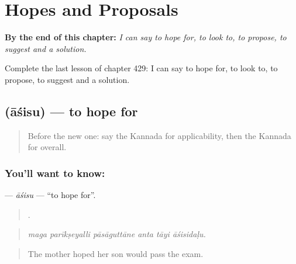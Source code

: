 
\chapter{Hopes and Proposals}
\label{ch:ka-hopes-and-proposals}

\begin{chapteropening}
\textbf{By the end of this chapter:} \emph{I can say to hope for, to look to, to propose, to suggest and a solution.}

Complete the last lesson of chapter 429: I can say to hope for, to look to, to propose, to suggest and a solution.
\end{chapteropening}

\section[\texorpdfstring{\kn{ಆಶಿಸು} (āśisu)}{ಆಶಿಸು (āśisu)}]{ (āśisu) — to hope for}

\label{lesson:KA-C429-asisu}



\begin{quote}
Before the new one: say the Kannada for applicability, then the Kannada for overall.
\end{quote}

\subsection*{You'll want to know: }
\textbf{} — \emph{āśisu} — \textquotedblleft{}to hope for\textquotedblright{}.

\begin{quote}
     .
\end{quote}

\begin{quote}
\emph{maga parīkṣeyalli pāsāguttāne anta tāyi āśisidaḷu.}
\end{quote}

\begin{quote}
The mother hoped her son would pass the exam.
\end{quote}


